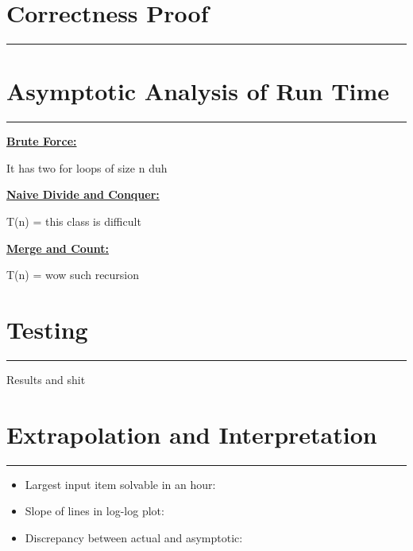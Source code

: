 \documentclass[letterpaper,10pt,titlepage,fleqn]{article}
\begin{document}
\section*{Correctness Proof}
\hrule

\section*{Asymptotic Analysis of Run Time}
\hrule
\begin{centering}
\underline{\large{\textbf{Brute Force:}}}\\
\end{centering}
It has two for loops of size n duh

\begin{centering}
\underline{\large{\textbf{Naive Divide and Conquer:}}}\\
\end{centering}
T(n) = this class is difficult

\begin{centering}
\underline{\large{\textbf{Merge and Count:}}}\\
\end{centering}
T(n) = wow such recursion


\section*{Testing}
\hrule
Results and shit

\section*{Extrapolation and Interpretation}
\hrule
\begin{itemize}
\item Largest input item solvable in an hour:
\item Slope of lines in log-log plot:
\item Discrepancy between actual and asymptotic:
\end{itemize}
\end{document}
